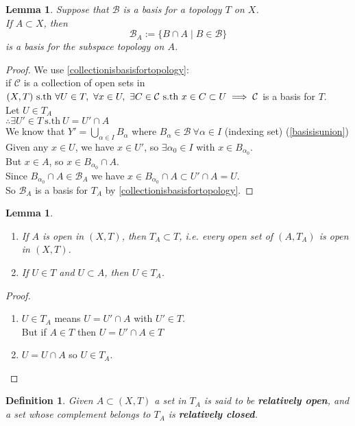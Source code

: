 \documentclass{article}
\newcommand{\sth}{\mathrm{s.th}\ }
\renewcommand{\c}{\mathcal{C}}
\newcommand{\ba}{\mathcal{B}}
\newtheorem{slemma}[stheorem]{Lemma}
\newtheorem{sdefinition}[stheorem]{Definition}
\theoremstyle{remark}
\theoremstyle{example}
\theoremstyle{examples}
\begin{document}
	\begin{slemma}
		Suppose that $\ba$ is a basis for a topology $T$ on $X$.\\
		If $A \subset X$, then \[\ba_A := \{B \cap A \mid B \in \ba\}\] is a basis for the subspace topology on $A$.
	\end{slemma}
	\begin{proof}
		We use \ref{collectionisbasisfortopology}:\\
		if $\c$ is a collection of open sets in $(X,T)\ \sth \forall U \in T,\ \forall x \in U,\ \exists C \in \c\ \sth x \in C \subset U\\ \implies \c$ is a basis for $T$.\\
		Let $U \in T_A$\\
		$\therefore \exists U' \in T\ \sth U = U' \cap A$\\
		We know that $Y'=\bigcup_{\alpha \in I} B_\alpha$ where $B_\alpha \in \ba\ \forall \alpha \in I$ (indexing set) (\ref{basisisunion})\\
		Given any $x \in U$, we have $x \in U'$, so $\exists \alpha_0 \in I$ with $x \in B_{\alpha_0}$.\\
		But $x \in A$, so $x \in B_{\alpha_0} \cap A$.\\
		Since $B_{\alpha_0} \cap A \in \ba_A$ we have $x \in B_{\alpha_0} \cap A \subset U' \cap A = U$.\\
		So $\ba_A$ is a basis for $T_A$ by \ref{collectionisbasisfortopology}.
	\end{proof}

	\begin{slemma}\ 
		\begin{enumerate}
			\item If $A$ is open in $(X,T)$, then $T_A \subset T$, i.e. every open set of $(A,T_A)$ is open in $(X,T)$.
			\item If $U \in T$ and $U \subset A$, then $U \in T_A$.
		\end{enumerate}
	\end{slemma}
	\begin{proof}\ 
		\begin{enumerate}
			\item $U \in T_A$ means $U=U' \cap A$ with $U' \in T$.\\
			But if $A \in T$ then $U=U' \cap A \in T$
			\item $U = U \cap A$ so $U \in T_A$.
		\end{enumerate}
	\end{proof}

	\begin{sdefinition}
		\label{relativelyopenclosed}
		Given $A \subset (X,T)$ a set in $T_A$ is said to be \textbf{relatively open}, and a set whose complement belongs to $T_A$ is \textbf{relatively closed}.
	\end{sdefinition}
\end{document}
